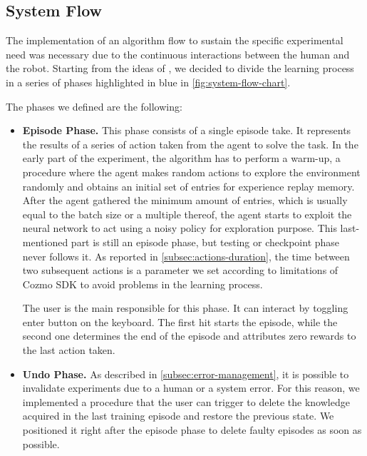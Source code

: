 \subsection{System Flow} \label{subsec:system-flow}

The implementation of an algorithm flow to sustain the specific experimental need was necessary due to the continuous interactions between the human and the robot. Starting from the ideas of \cite{kendall2018learning,kendall2019learning}, we decided to divide the learning process in a series of phases highlighted in blue in \vref{fig:system-flow-chart}.

The phases we defined are the following:

\begin{itemize}
    \item \textbf{Episode Phase.} This phase consists of a single episode take.
          It represents the results of a series of action taken from the agent to solve the task.
          In the early part of the experiment, the algorithm has to perform a warm-up, a procedure where the agent makes random actions to explore the environment randomly and obtains an initial set of entries for experience replay memory.
          After the agent gathered the minimum amount of entries, which is usually equal to the batch size or a multiple thereof, the agent starts to exploit the neural network to act using a noisy policy for exploration purpose.
          This last-mentioned part is still an episode phase, but testing or checkpoint phase never follows it.
          As reported in \vref{subsec:actions-duration}, the time between two subsequent actions is a parameter we set according to limitations of Cozmo SDK to avoid problems in the learning process.

          The user is the main responsible for this phase. It can interact by toggling enter button on the keyboard. The first hit starts the episode, while the second one determines the end of the episode and attributes zero rewards to the last action taken.

    \item \textbf{Undo Phase.} As described in \vref{subsec:error-management}, it is possible to invalidate experiments due to a human or a system error. For this reason, we implemented a procedure that the user can trigger to delete the knowledge acquired in the last training episode and restore the previous state. We positioned it right after the episode phase to delete faulty episodes as soon as possible.


\end{itemize}

